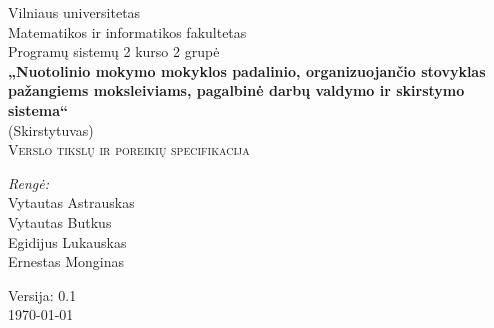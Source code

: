 \begin{titlepage}

  \begin{center}


    {\Large Vilniaus universitetas\\
    Matematikos ir informatikos fakultetas\\
    Programų sistemų 2 kurso 2 grupė}\\[6.0cm]

    \textbf{ \LARGE „Nuotolinio mokymo mokyklos padalinio, 
    organizuojančio stovyklas pažangiems moksleiviams, pagalbinė darbų 
    valdymo ir skirstymo sistema“ }\\
    { \Large (Skirstytuvas)}\\[0.5cm]

    \textsc{\Large Verslo tikslų ir poreikių specifikacija }\\[4.0cm]

    \begin{minipage}[]{0.8\textwidth}
      \begin{flushright} \large
        \emph{Rengė:} \\
        Vytautas Astrauskas \\
        Vytautas Butkus \\
        Egidijus Lukauskas \\
        Ernestas Monginas
      \end{flushright}
    \end{minipage}

    \vfill

    {\large  Versija: 0.1 \\ \today }
  \end{center}
  
\end{titlepage}
